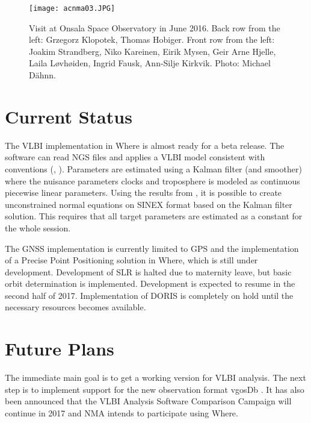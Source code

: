 \documentclass[twocolumn,twoside]{svmultivs_br} %
\begin{document}
\begin{figure}[htb!]
\centering
\texttt{[image: acnma03.JPG]}
\caption{Visit at Onsala Space Observatory in June 2016. Back row from the left: Grzegorz Klopotek, Thomas Hobiger. Front row from the left: Joakim Strandberg, Niko Kareinen, Eirik Mysen, Geir Arne Hjelle, Laila L\o vh\o iden, Ingrid Fausk, Ann-Silje Kirkvik. Photo: Michael D\"{a}hnn.}
\label{fig:onsala}
\end{figure}


\section{Current Status}
The VLBI implementation in Where is almost ready for a beta release. The software can read NGS files and applies a VLBI model consistent with conventions (\cite{iers2010}, \cite{deform}). Parameters are estimated using a Kalman filter (and smoother) where the nuisance parameters clocks and troposphere is modeled as continuous piecewise linear parameters. Using the results from \cite{neq}, it is possible to create unconstrained normal equations on SINEX format based on the Kalman filter solution. This requires that all target parameters are estimated as a constant for the whole session. 

The GNSS implementation is currently limited to GPS and the implementation of a Precise Point Positioning solution in Where, which is still under development. Development of SLR is halted due to maternity leave, but basic orbit determination is implemented. Development is expected to resume in the second half of 2017. Implementation of DORIS is completely on hold until the necessary resources becomes available.

\section{Future Plans}

The immediate main goal is to get a working version for VLBI analysis. The next step is to implement support for the new observation format vgosDb \cite{vgosdb}. It has also been announced that the VLBI Analysis Software Comparison Campaign will continue in 2017 and NMA intends to participate using Where. 
\end{document}
